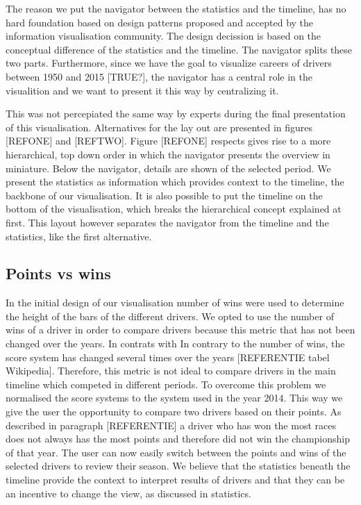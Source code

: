 \documentclass{sigchi}
\begin{document}
The reason we put the navigator between the statistics and the timeline, has no hard foundation based on design patterns proposed and accepted by the information visualisation community. The design decission is based on the conceptual difference of the statistics and the timeline. The navigator splits these two parts. Furthermore, since we have the goal to visualize careers of drivers between 1950 and 2015 [TRUE?], the navigator has a central role in the visualition and we want to present it this way by centralizing it.

This was not percepiated the same way by experts during the final presentation of this visualisation. Alternatives for the lay out are presented in figures [REFONE] and [REFTWO]. Figure [REFONE] respects gives rise to a more hierarchical, top down order in which the navigator presents the overview in miniature. Below the navigator, details are shown of the selected period. We present the statistics as information which provides context to the timeline, the backbone of our visualisation. It is also possible to put the timeline on the bottom of the visualisation, which breaks the hierarchical concept explained at first. This layout however separates the navigator from the timeline and the statistics, like the first alternative. 


\subsection{Points vs wins} %
\label{sub:points_vs_wins}
In the initial design of our visualisation number of wins were used to determine the height of the bars of the different drivers. We opted to use the number of wins of a driver in order to compare drivers because this metric that has not been changed over the years. In contrats with In contrary to the number of wins, the score system has changed several times over the years [REFERENTIE tabel Wikipedia]. Therefore, this metric is not ideal to compare drivers in the main timeline which competed in different periods. To overcome this problem we normalised the score systems to the system used in the year 2014. This way we give the user the opportunity to compare two drivers based on their points. As described in paragraph [REFERENTIE] a driver who has won the most races does not always has the most points and therefore did not win the championship of that year. The user can now easily switch between the points and wins of the selected drivers to review their season. We believe that the statistics beneath the timeline provide the context to interpret results of drivers and that they can be an incentive to change the view, as discussed in statistics.
\end{document}
